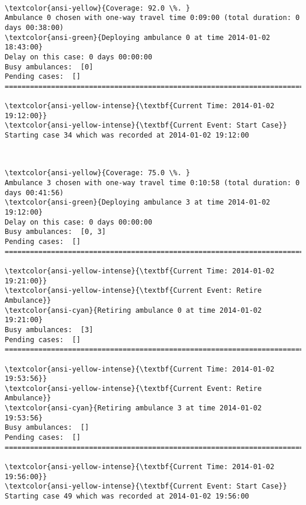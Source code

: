 \documentclass[11pt]{article}
\begin{document}
    \begin{center}
    \end{center}
    { \hspace*{\fill} \\}
    
    \begin{Verbatim}[commandchars=\\\{\}]
\textcolor{ansi-yellow}{Coverage: 92.0 \%. }
Ambulance 0 chosen with one-way travel time 0:09:00 (total duration: 0 days 00:38:00)
\textcolor{ansi-green}{Deploying ambulance 0 at time 2014-01-02 18:43:00}
Delay on this case: 0 days 00:00:00
Busy ambulances:  [0]
Pending cases:  []
========================================================================

\textcolor{ansi-yellow-intense}{\textbf{Current Time: 2014-01-02 19:12:00}}
\textcolor{ansi-yellow-intense}{\textbf{Current Event: Start Case}}
Starting case 34 which was recorded at 2014-01-02 19:12:00

    \end{Verbatim}

    \begin{center}
    \end{center}
    { \hspace*{\fill} \\}
    
    \begin{Verbatim}[commandchars=\\\{\}]
\textcolor{ansi-yellow}{Coverage: 75.0 \%. }
Ambulance 3 chosen with one-way travel time 0:10:58 (total duration: 0 days 00:41:56)
\textcolor{ansi-green}{Deploying ambulance 3 at time 2014-01-02 19:12:00}
Delay on this case: 0 days 00:00:00
Busy ambulances:  [0, 3]
Pending cases:  []
========================================================================

\textcolor{ansi-yellow-intense}{\textbf{Current Time: 2014-01-02 19:21:00}}
\textcolor{ansi-yellow-intense}{\textbf{Current Event: Retire Ambulance}}
\textcolor{ansi-cyan}{Retiring ambulance 0 at time 2014-01-02 19:21:00}
Busy ambulances:  [3]
Pending cases:  []
========================================================================

\textcolor{ansi-yellow-intense}{\textbf{Current Time: 2014-01-02 19:53:56}}
\textcolor{ansi-yellow-intense}{\textbf{Current Event: Retire Ambulance}}
\textcolor{ansi-cyan}{Retiring ambulance 3 at time 2014-01-02 19:53:56}
Busy ambulances:  []
Pending cases:  []
========================================================================

\textcolor{ansi-yellow-intense}{\textbf{Current Time: 2014-01-02 19:56:00}}
\textcolor{ansi-yellow-intense}{\textbf{Current Event: Start Case}}
Starting case 49 which was recorded at 2014-01-02 19:56:00

    \end{Verbatim}
\end{document}
